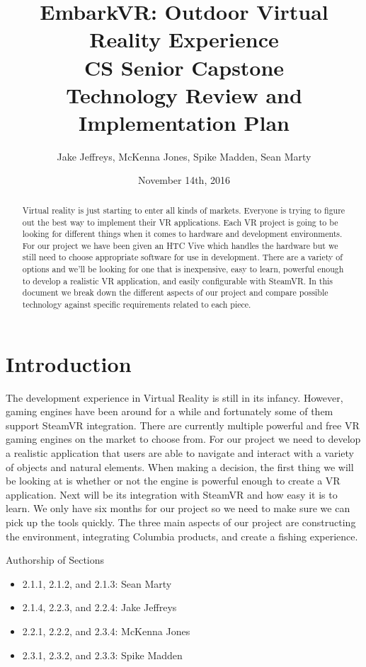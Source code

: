 \documentclass[10pt,journal,compsoc,onecolumn, draftclsnofoot]{IEEEtran}
\title{
EmbarkVR: Outdoor Virtual Reality Experience \\
CS Senior Capstone \\
Technology Review and Implementation Plan\\
\vspace{3cm}
}
\author{Jake Jeffreys, McKenna Jones, Spike Madden, Sean Marty}
\date{November 14th, 2016}
\begin{document}
\begin{bibunit}
\begin{titlepage}
\vspace{3cm}
\maketitle
\vspace{3cm}
\begin{abstract}
Virtual reality is just starting to enter all kinds of markets.
Everyone is trying to figure out the best way to implement their VR applications.
Each VR project is going to be looking for different things when it comes to hardware and development environments.
For our project we have been given an HTC Vive which handles the hardware but we still need to choose appropriate software for use in development.
There are a variety of options and we'll be looking for one that is inexpensive, easy to learn, powerful enough to develop a realistic VR application, and easily configurable with SteamVR.
In this document we break down the different aspects of our project and compare possible technology against specific requirements related to each piece.
\end{abstract}

\end{titlepage}

\tableofcontents
\clearpage

\section{Introduction}
The development experience in Virtual Reality is still in its infancy.
However, gaming engines have been around for a while and fortunately some of them support SteamVR integration.
There are currently multiple powerful and free VR gaming engines on the market to choose from.
For our project we need to develop a realistic application that users are able to navigate and interact with a variety of objects and natural elements.
When making a decision, the first thing we will be looking at is whether or not the engine is powerful enough to create a VR application.
Next will be its integration with SteamVR and how easy it is to learn.
We only have six months for our project so we need to make sure we can pick up the tools quickly.
The three main aspects of our project are constructing the environment, integrating Columbia products, and create a fishing experience.

Authorship of Sections
\begin{itemize}
	\item 2.1.1, 2.1.2, and 2.1.3: Sean Marty
	\item 2.1.4, 2.2.3, and 2.2.4: Jake Jeffreys
	\item 2.2.1, 2.2.2, and 2.3.4: McKenna Jones
	\item 2.3.1, 2.3.2, and 2.3.3: Spike Madden
\end{itemize}


\end{bibunit}
\end{document}
